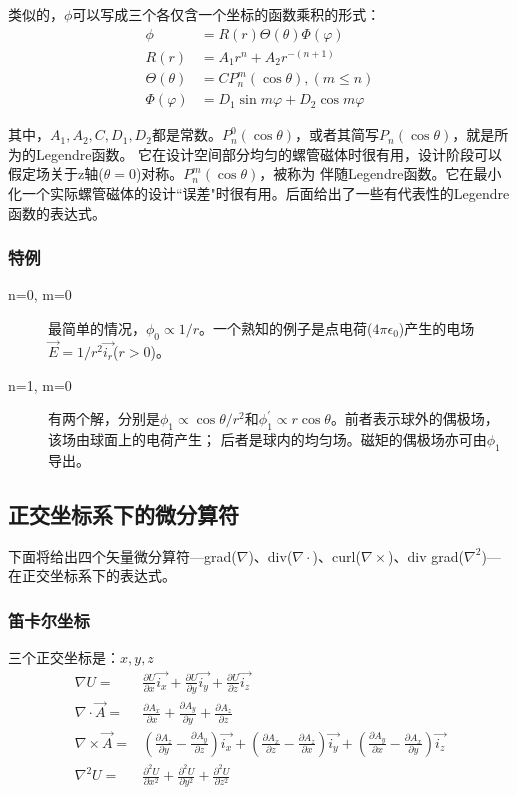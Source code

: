 类似的，$\phi$可以写成三个各仅含一个坐标的函数乘积的形式：
\begin{subequations}
	\begin{align}
  \phi&=R(r)\Theta(\theta)\Phi(\varphi)\\
  R(r)&=A_1 r^n+A_2 r^{-(n+1)} \\
  \Theta(\theta)&=C P_n^m(\cos \theta), (m \le n) \\
  \Phi(\varphi)&=D_1 \sin m\varphi +D_2 \cos m\varphi
  	\end{align}
\end{subequations}

其中，$A_1, A_2, C, D_1, D_2$都是常数。$P_n^0(\cos \theta)$，或者其简写$P_n(\cos\theta)$，就是所为的Legendre函数。
它在设计空间部分均匀的螺管磁体时很有用，设计阶段可以假定场关于z轴($\theta=0$)对称。$P_n^m(\cos\theta)$，被称为
伴随Legendre函数。它在最小化一个实际螺管磁体的设计``误差"时很有用。后面给出了一些有代表性的Legendre函数的表达式。

\subsubsection{特例}
\begin{description}
  \item[n=0, m=0] 最简单的情况，$\phi_0\propto 1/r$。一个熟知的例子是点电荷($4\pi\epsilon_0$)产生的电场$\vec{E}=1/r^2 \vec{i_r}$($r>0$)。
  \item[n=1, m=0] 有两个解，分别是$\phi_1 \propto \cos\theta /r^2$和$\phi_1^\prime\propto r\cos\theta$。前者表示球外的偶极场，该场由球面上的电荷产生；
  后者是球内的均匀场。磁矩的偶极场亦可由$\phi_1$导出。
\end{description}

\subsection{正交坐标系下的微分算符}
下面将给出四个矢量微分算符---grad($\nabla$)、div($\nabla\cdot$)、curl($\nabla\times$)、div grad($\nabla^2$)---在正交坐标系下的表达式。
\subsubsection{笛卡尔坐标}
三个正交坐标是：$x, y, z$
\begin{subequations}\label{eqn:field cart}
	\begin{align}
\nabla U=&\frac{\partial U}{\partial x}\vec{i_x} +\frac{\partial U}{\partial y}\vec{i_y}+\frac{\partial U}{\partial z}\vec{i_z}  \\
\nabla\cdot \vec{A}=& \frac{\partial{A_x}}{\partial x} +\frac{\partial{A_y}}{\partial y}+\frac{\partial{A_z}}{\partial z}\\
\nabla\times \vec{A}=& (\frac{\partial{A_z}}{\partial y} -\frac{\partial{A_y}}{\partial z})\vec{i_x} + (\frac{\partial{A_x}}{\partial z} -\frac{\partial{A_z}}{\partial x}) \vec{i_y}
+ (\frac{\partial{A_y}}{\partial x} -\frac{\partial{A_x}}{\partial y})\vec{i_z} \\
\nabla^2 U=&\frac{\partial^2 U}{\partial x^2}+\frac{\partial^2 U}{\partial y^2}+\frac{\partial^2 U}{\partial z^2}
  	\end{align}
\end{subequations}

